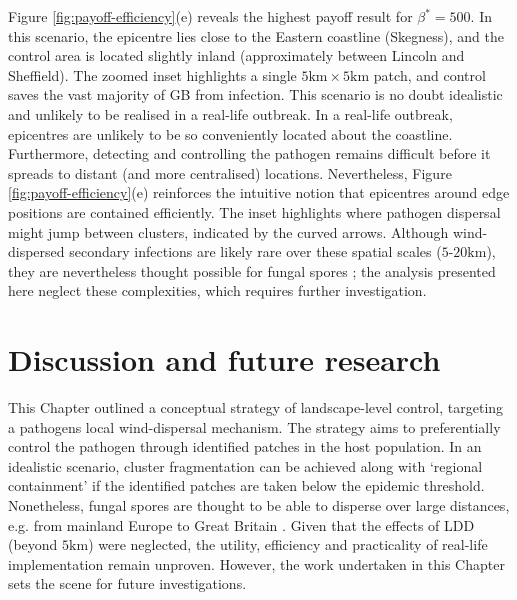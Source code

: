 Figure \ref{fig:payoff-efficiency}(e) reveals the highest payoff result for $\beta^*=500$.
In this scenario, the epicentre lies close to the Eastern coastline (Skegness), 
and the control area is located slightly inland (approximately between Lincoln and Sheffield).
The zoomed inset highlights a single $\mathrm{5km \times 5 km}$ patch, and control saves the vast majority of GB from infection.
This scenario is no doubt idealistic and unlikely to be realised in a real-life outbreak.
In a real-life outbreak, epicentres are unlikely to be so conveniently located about the coastline.
Furthermore, detecting and controlling the pathogen remains difficult before it spreads to distant (and more centralised) locations.
Nevertheless, Figure \ref{fig:payoff-efficiency}(e) reinforces the intuitive notion that epicentres around edge positions are contained efficiently.
The inset highlights where pathogen dispersal might jump between clusters, indicated by the curved arrows.
Although wind-dispersed secondary infections are likely rare over these spatial scales ($5$-$20\mathrm{km}$), they are nevertheless thought possible for fungal spores \cite{grosdidier2018tracking};
the analysis presented here neglect these complexities, which requires further investigation.


\newpage 

\section{Discussion and future research}

This Chapter outlined a conceptual strategy of landscape-level control, targeting a pathogens local wind-dispersal mechanism.
The strategy aims to preferentially control the pathogen through identified patches in the host population. 
In an idealistic scenario, cluster fragmentation can be achieved along with `regional containment' if the identified patches are taken below the epidemic threshold.
Nonetheless, fungal spores are thought to be able to disperse over large distances, e.g. from mainland Europe to Great Britain \cite{wylder2018evidence, freer2017tree}.
Given that the effects of LDD (beyond $5\mathrm{km}$) were neglected, the utility, efficiency and practicality of real-life implementation remain unproven. However, the work undertaken in this Chapter sets the scene for future investigations.

